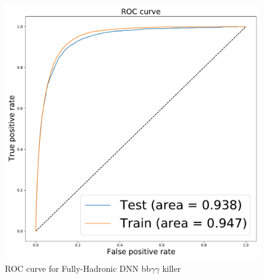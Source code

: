 


\begin{figure}[!htbp]
  \centering
  \includegraphics[scale=0.4]{Sections/HHWWgg/images/FH_DNN/BBgg/ROC.pdf}%
  \caption{ROC curve for Fully-Hadronic DNN bb$\gamma \gamma$ killer}
  \label{fig:FH_DNN_ROC_bbggVsAll}
\end{figure}


